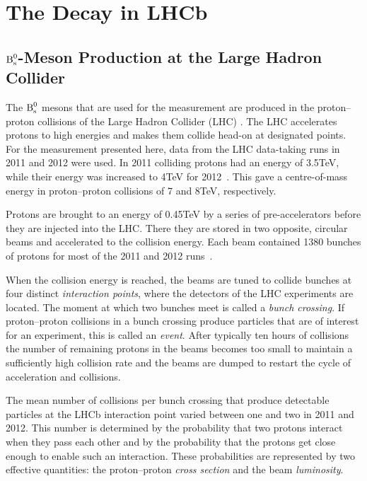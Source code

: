 \section{The \texorpdfstring{\BstoJpsiKK}{Bs0->J/psi K+K-} Decay in LHCb}
\label{sec:intro_LHCb}

\subsection{\texorpdfstring{$\text{B}_\text{s}^\text{0}$}{Bs0}-Meson Production at the Large Hadron Collider}
\label{subsec:intro_LHCb_LHC}

The $\text{B}_\text{s}^\text{0}$ mesons that are used for the \BstoJpsiKK{} measurement are produced in the proton--proton collisions of the Large Hadron Collider
(LHC) \cite{Evans:2008zzb}. The LHC accelerates protons to high energies and makes them collide head-on at designated points. For the
measurement presented here, data from the LHC data-taking runs in 2011 and 2012 were used. In 2011 colliding protons had an energy of
3.5\unitsp{}TeV, while their energy was increased to 4\unitsp{}TeV for 2012~\cite{Pojer:2013kka}. This gave a centre-of-mass energy in
proton--proton collisions of 7 and 8\unitsp{}TeV, respectively.

Protons are brought to an energy of 0.45\unitsp{}TeV by a series of pre-accelerators before they are injected into the LHC. There they are
stored in two opposite, circular beams and accelerated to the collision energy. Each beam contained 1380 bunches of  protons for
most of the 2011 and 2012 runs~\cite{Pojer:2013kka}.

When the collision energy is reached, the beams are tuned to collide bunches at four distinct \emph{interaction points}, where the
detectors of the LHC experiments are located. The moment at which two bunches meet is called a \emph{bunch crossing}. If proton--proton
collisions in a bunch crossing produce particles that are of interest for an experiment, this is called an \emph{event}. After typically
ten hours of collisions the number of remaining protons in the beams becomes too small to maintain a sufficiently high collision rate and
the beams are dumped to restart the cycle of acceleration and collisions.

The mean number of collisions per bunch crossing that produce detectable particles at the LHCb interaction point varied between one and two
in 2011 and 2012. This number is determined by the probability that two protons interact when they pass each other and by the probability
that the protons get close enough to enable such an interaction. These probabilities are represented by two effective quantities: the
proton--proton \emph{cross section} and the beam \emph{luminosity}.

